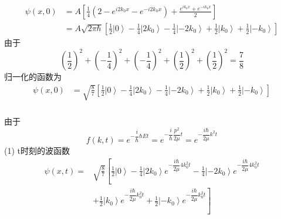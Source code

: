 \begin{frame}[label=current]
  \frametitle{}
  \[ \begin{aligned}
    \psi(x,0) 
    &= A\left[\frac{1}{4}\left( 2 -e^{i 2k_0 x} - e^{-i 2k_0 x}\right)+ \frac{e^{ik_0 x}+ e^{-ik_0 x}}{2}\right] \\
    &= A \sqrt{2\pi \hbar} \left[\frac{1}{2} \left\vert 0 \right\rangle - \frac{1}{4} \left\vert 2k_0 \right\rangle - \frac{1}{4} \left\vert -2k_0 \right\rangle + \frac{1}{2} \left\vert k_0 \right\rangle + \frac{1}{2} \left\vert -k_0 \right\rangle\right]
  \end{aligned}\]
  由于\[ \left(\frac{1}{2}\right)^2 + \left(-\frac{1}{4}\right)^2 +  \left(-\frac{1}{4}\right)^2 +  \left(\frac{1}{2}\right)^2  +  \left(\frac{1}{2}\right)^2 = \frac{7}{8} \]
  归一化的函数为
  \[ \begin{aligned}
    \psi(x,0) 
    &= \sqrt{\frac{8}{7} } \left[\frac{1}{2} \left\vert 0 \right\rangle - \frac{1}{4} \left\vert 2k_0 \right\rangle - \frac{1}{4} \left\vert -2k_0 \right\rangle + \frac{1}{2} \left\vert k_0 \right\rangle + \frac{1}{2} \left\vert -k_0 \right\rangle\right]
  \end{aligned}\]
\end{frame} 

\begin{frame}[label=current]
  \frametitle{}
  由于\[f(k,t) = e^{-\dfrac{i}{\hbar}\hbar E t} = e^{-\dfrac{i}{\hbar} \dfrac{p^2}{2\mu} t } =   e^{-\dfrac{i \hbar}{2\mu} k^2 t }\]
(1) t时刻的波函数
\[ \begin{aligned}
  \psi(x,t) 
  = & \sqrt{\frac{8}{7} } \left[\frac{1}{2} \left\vert 0 \right\rangle - \frac{1}{4} \left\vert 2k_0 \right\rangle e^{-\dfrac{i \hbar}{2\mu} 4k_0^2 t }- \frac{1}{4} \left\vert -2k_0 \right\rangle e^{-\dfrac{i \hbar}{2\mu} 4k_0^2 t } \right. \\ & \left.+ \frac{1}{2} \left\vert k_0 \right\rangle e^{-\dfrac{i \hbar}{2\mu} k_0^2 t } + \frac{1}{2} \left\vert -k_0 \right\rangle e^{-\dfrac{i \hbar}{2\mu} k_0^2 t }\right]
\end{aligned}\]
\end{frame} 

